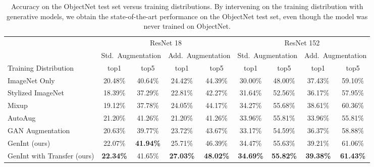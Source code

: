 \documentclass[final]{cvpr}
\begin{document}
\begin{table*}[t]
\begin{center}
      \vspace{-3mm}
    \small
    \centering
    \begin{tabular}{l|cc|cc|cc|cc}
         \toprule
         & \multicolumn{4}{c|}{ResNet 18}  & \multicolumn{4}{c}{ResNet 152} \\
         & \multicolumn{2}{c|}{Std.\ Augmentation}  & \multicolumn{2}{c|}{Add.\ Augmentation} & \multicolumn{2}{c|}{Std.\ Augmentation}  & \multicolumn{2}{c}{Add.\ Augmentation}\\
          Training Distribution & top1   & top5  & top1 & top5 & top1   & top5  & top1 & top5\\
         \midrule  
ImageNet Only \cite{He_2016, Objectnet}  & 20.48\% & 40.64\% & 24.42\% & 44.39\% & 30.00\% & 48.00\% & 37.43\% & 59.10\% \\
         Stylized ImageNet \cite{imagenetbiased} & 18.39\% & 37.29\% & 22.81\% & 42.27\% & 31.64\% & 52.56\% & 36.17\% & 57.95\%  \\
         Mixup \cite{zhang2017mixup} & 19.12\% & 37.78\% & 24.05\% & 44.17\% & 34.27\% & 55.68\% & 38.61\% & 60.36\%\\
         AutoAug \cite{cubuk2018autoaugment} & 21.20\% & 41.26\% & 21.20\% & 41.26\% & 33.96\% & 55.81\% & 33.96\% & 55.81\% \\
          GAN Augmentation \cite{CAS}  & 20.63\%  & 39.77\% &  23.72\% & 43.67\% & 33.17\% & 54.59\% & 36.37\% & 58.88\% \\
          \midrule
          GenInt (ours)  & 22.07\% & \textbf{41.94\%} &  25.71\% & 46.39\% & 34.47\% & 55.63\% & 39.21\% & 61.06\%\\
GenInt with Transfer (ours) & \textbf{22.34\%} & 41.65\% & \textbf{27.03\%} & \textbf{48.02\%} & \textbf{34.69\%} & \textbf{55.82\%} & \textbf{39.38\%} & \textbf{61.43\%}\\
        
         \bottomrule
    \end{tabular}
\end{center}
      \vspace{-2mm}
\caption{Accuracy on the ObjectNet test set versus training distributions. By intervening on the training distribution with generative models, we obtain the state-of-the-art performance on the ObjectNet test set, even though the model was never trained on ObjectNet.} \label{tab:objectnet}
\end{table*}
\end{document}
